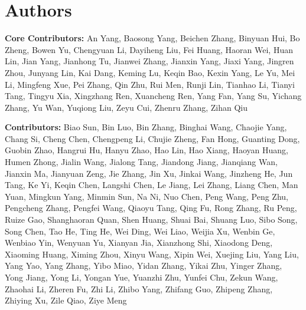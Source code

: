 \section{Authors}

\textbf{Core Contributors:} An Yang, Baosong Yang, Beichen Zhang, Binyuan Hui, Bo Zheng, Bowen Yu, Chengyuan Li, Dayiheng Liu, Fei Huang, Haoran Wei, Huan Lin, Jian Yang, Jianhong Tu, Jianwei Zhang, Jianxin Yang, Jiaxi Yang, Jingren Zhou, Junyang Lin, Kai Dang, Keming Lu, Keqin Bao, Kexin Yang, Le Yu, Mei Li, Mingfeng Xue, Pei Zhang, Qin Zhu, Rui Men, Runji Lin, Tianhao Li, Tianyi Tang, Tingyu Xia, Xingzhang Ren, Xuancheng Ren, Yang Fan, Yang Su, Yichang Zhang, Yu Wan, Yuqiong Liu, Zeyu Cui, Zhenru Zhang, Zihan Qiu

\textbf{Contributors:} Biao Sun, Bin Luo, Bin Zhang, Binghai Wang, Chaojie Yang, Chang Si, Cheng Chen, Chengpeng Li, Chujie Zheng, Fan Hong, Guanting Dong, Guobin Zhao, Hangrui Hu, Hanyu Zhao, Hao Lin, Hao Xiang, Haoyan Huang, Humen Zhong, Jialin Wang, Jialong Tang, Jiandong Jiang, Jianqiang Wan, Jianxin Ma, Jianyuan Zeng, Jie Zhang, Jin Xu, Jinkai Wang, Jinzheng He, Jun Tang, Ke Yi, Keqin Chen, Langshi Chen, Le Jiang, Lei Zhang, Liang Chen, Man Yuan, Mingkun Yang, Minmin Sun, Na Ni, Nuo Chen, Peng Wang, Peng Zhu, Pengcheng Zhang, Pengfei Wang, Qiaoyu Tang, Qing Fu, Rong Zhang, Ru Peng, Ruize Gao, Shanghaoran Quan, Shen Huang, Shuai Bai, Shuang Luo, Sibo Song, Song Chen, Tao He, Ting He, Wei Ding, Wei Liao, Weijia Xu, Wenbin Ge, Wenbiao Yin, Wenyuan Yu, Xianyan Jia, Xianzhong Shi, Xiaodong Deng, Xiaoming Huang, Ximing Zhou, Xinyu Wang, Xipin Wei, Xuejing Liu, Yang Liu, Yang Yao, Yang Zhang, Yibo Miao, Yidan Zhang, Yikai Zhu, Yinger Zhang, Yong Jiang, Yong Li, Yongan Yue, Yuanzhi Zhu, Yunfei Chu, Zekun Wang, Zhaohai Li, Zheren Fu, Zhi Li, Zhibo Yang, Zhifang Guo, Zhipeng Zhang, Zhiying Xu, Zile Qiao, Ziye Meng